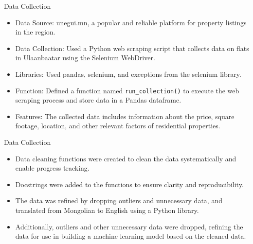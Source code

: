 \documentclass[11pt, aspectratio=169]{beamer}
\begin{document}
\begin{frame}{Data Collection}
    \begin{itemize}
        \item Data Source: unegui.mn, a popular and reliable platform for property listings in the region.
        \item Data Collection: Used a Python web scraping script that collects data on flats in Ulaanbaatar using the Selenium WebDriver.
        \item Libraries: Used pandas, selenium, and exceptions from the selenium library.
        \item Function: Defined a function named \texttt{run\_collection()} to execute the web scraping process and store data in a Pandas dataframe.
        \item Features: The collected data includes information about the price, square footage, location, and other relevant factors of residential properties.
    \end{itemize}
\end{frame}

\begin{frame}{Data Collection}
    \begin{itemize}
        \item Data cleaning functions were created to clean the data systematically and enable progress tracking.
        \item Docstrings were added to the functions to ensure clarity and reproducibility.
        \item The data was refined by dropping outliers and unnecessary data, and translated from Mongolian to English using a Python library.
        \item Additionally, outliers and other unnecessary data were dropped, refining the data for use in building a machine learning model based on the cleaned data.
    \end{itemize}
\end{frame}

%
%
%
\end{document}
